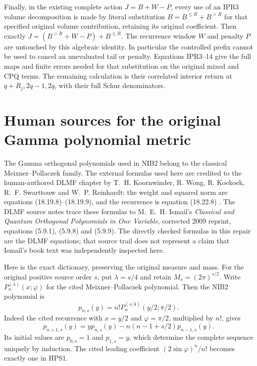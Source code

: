 \documentclass[11pt,a4paper]{article}
\begin{document}
Finally, in the existing complete action $J=B+W-P$, every
use of an IPR3 volume decomposition is made by literal
substitution $B=B^{\le R}+B^{>R}$ for that specified original
volume contribution, retaining its original coefficient.
Then exactly $J=(B^{>R}+W-P)+B^{\le R}$.
The recurrence window $W$ and penalty $P$ are untouched by
this algebraic identity. In particular the controlled prefix
cannot be used to cancel an unevaluated tail or penalty.
Equations IPR3--14 give the full maps and finite errors needed
for that substitution on the original mixed and CPQ terms.
The remaining calculation is their correlated interior return
at $q+R_j,2q-1,2q$, with their full Schur denominators.
\endgroup

\label{MTBUILD:INTERIOR_PREFIX_RETURN_COMPLETE_PREREQUISITE:end}

\clearpage
\label{MTBUILD:NIB_SOURCE_ATTRIBUTION:start}
\begingroup
\section{Human sources for the original Gamma polynomial metric}
\label{sec:human-NIB-sources}

The Gamma orthogonal polynomials used in NIB2 belong to the classical
Meixner--Pollaczek family. The external formulas used here are credited
to the human-authored DLMF chapter by T.~H. Koornwinder, R. Wong,
R. Koekoek, R.~F. Swarttouw and W.~P. Reinhardt: the weight and squared
norm are equations (18.19.8)--(18.19.9), and the recurrence is equation
(18.22.8) \cite{human:dlmf18}. The DLMF source notes trace these formulas
to M.~E.~H. Ismail's \emph{Classical and Quantum Orthogonal Polynomials
in One Variable}, corrected 2009 reprint, equations (5.9.1), (5.9.8)
and (5.9.9). The directly checked formulas in this repair are the DLMF
equations; that source trail does not represent a claim that Ismail's
book text was independently inspected here.

Here is the exact dictionary, preserving the original measure and mass.
For the original positive source order $s$, put $\lambda=s/4$ and retain
$M_s=(2\pi)^{s/2}$. Write $P_n^{(\lambda)}(x;\varphi)$ for the cited
Meixner--Pollaczek polynomial. Then the NIB2 polynomial is
\[
 p_{n,s}(y)=n!P_n^{(s/4)}(y/2;\pi/2).                 \tag{HPS1}
\]
Indeed the cited recurrence with $x=y/2$ and $\varphi=\pi/2$, multiplied
by $n!$, gives
\[
 p_{n+1,s}(y)=yp_{n,s}(y)-n(n-1+s/2)p_{n-1,s}(y).
                                                               \tag{HPS2}
\]
Its initial values are $p_{0,s}=1$ and $p_{1,s}=y$, which determine
the complete sequence uniquely by induction. The cited leading
coefficient $(2\sin\varphi)^n/n!$ becomes exactly one in HPS1.
\end{document}
